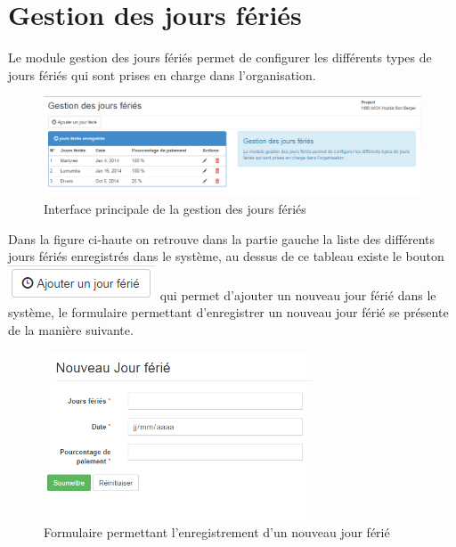\documentclass[12pt,a4paper]{report}
\begin{document}
\newpage


\section{Gestion des jours fériés}
Le module gestion des jours fériés permet de configurer les différents types de jours fériés qui sont prises en charge dans l'organisation.

\begin{figure}[h]
\begin{center}
\includegraphics[width=14cm]{pic/GestJourFerie.png}
\end{center}
\caption{Interface principale de la gestion des jours fériés}
\label{Interface principale de la gestion des jours fériés}
\end{figure}

Dans la figure ci-haute on retrouve dans la partie gauche la liste des différents jours fériés enregistrés dans le système, au dessus de ce tableau existe le bouton \includegraphics[scale=1]{pic/AddOffDays.png} qui permet d'ajouter un nouveau jour férié dans le système, le formulaire permettant d'enregistrer un nouveau jour férié se présente de la manière suivante.

\begin{figure}[h]
\begin{center}
\includegraphics[width=8cm]{pic/FormNewOffDays.png}
\end{center}
\caption{Formulaire permettant l'enregistrement d'un nouveau jour férié}
\label{Formulaire permettant l'enregistrement d'un nouveau jour férié}
\end{figure} 
\end{document}
